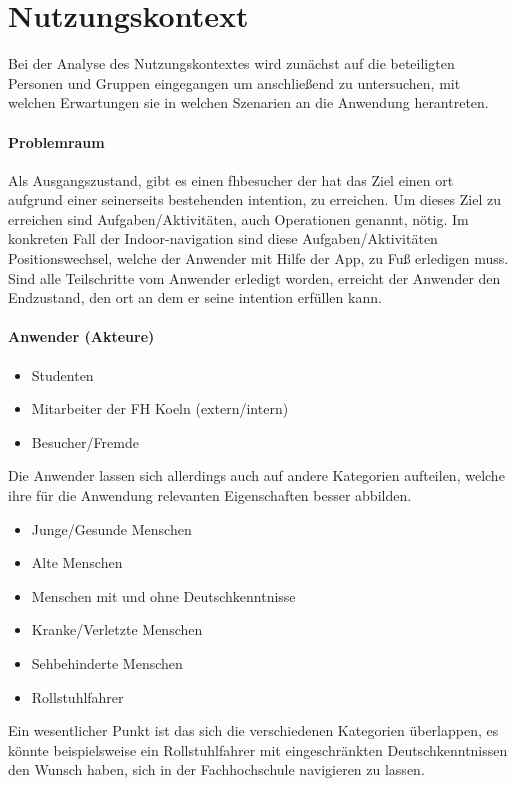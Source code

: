 \chapter{Nutzungskontext}
Bei der Analyse des Nutzungskontextes wird zunächst auf die beteiligten Personen und Gruppen eingegangen um anschließend zu untersuchen, mit welchen Erwartungen sie in welchen Szenarien an die Anwendung herantreten.

\subsubsection*{Problemraum}
Als Ausgangszustand, gibt es einen \gls{fhbesucher} der hat das Ziel einen \gls{ort} aufgrund einer seinerseits bestehenden \gls{intention}, zu erreichen. Um dieses Ziel zu erreichen sind Aufgaben/Aktivitäten, auch Operationen genannt, nötig. Im konkreten Fall der Indoor-\gls{navigation} sind diese Aufgaben/Aktivitäten Positionswechsel, welche der Anwender mit Hilfe der App, zu Fuß erledigen muss. Sind alle Teilschritte vom Anwender erledigt worden, erreicht der Anwender den Endzustand, den \gls{ort} an dem er seine \gls{intention} erfüllen kann.

\subsubsection*{Anwender (Akteure)}
\begin{itemize}
  \item Studenten
  \item Mitarbeiter der FH Koeln (extern/intern)
  \item Besucher/Fremde
\end{itemize}

\noindent
Die Anwender lassen sich allerdings auch auf andere Kategorien aufteilen, welche ihre für die Anwendung relevanten Eigenschaften besser abbilden.
\begin{itemize}
  \item Junge/Gesunde Menschen
  \item Alte Menschen
  \item Menschen mit und ohne Deutschkenntnisse
  \item Kranke/Verletzte Menschen
  \item Sehbehinderte Menschen
  \item Rollstuhlfahrer
\end{itemize}

\noindent
Ein wesentlicher Punkt ist das sich die verschiedenen Kategorien überlappen, es könnte beispielsweise ein Rollstuhlfahrer mit eingeschränkten Deutschkenntnissen den Wunsch haben, sich in der Fachhochschule navigieren zu lassen.

